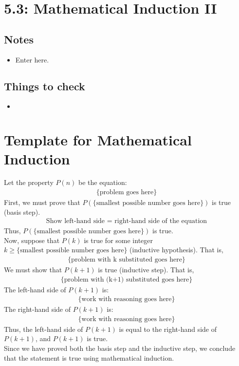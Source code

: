 \documentclass{article}
\begin{document}
\newpage \section{5.3: Mathematical Induction II}
    \subsection{Notes}
        \begin{itemize}
            \item Enter here.
        \end{itemize}

    \subsection{Things to check}
        \begin{itemize}
            \item 
        \end{itemize}

\newpage \section{Template for Mathematical Induction}
    Let the property $P(n)$ be the equation:
    \begin{align*}
        \text{\{problem goes here\}}
    \end{align*}
    First, we must prove that $P(\text{\{smallest possible number goes here\}})$ is true (basis step).
    \begin{align*}
        \text{Show left-hand side = right-hand side of the equation}
    \end{align*}
    Thus, $P(\text{\{smallest possible number goes here\}})$ is true. \\
    Now, suppose that $P(k)$ is true for some integer $k \geq \text{\{smallest possible number goes here\}}$ (inductive hypothesis). That is, 
    \begin{align*}
        \text{\{problem with k substituted goes here\}}
    \end{align*}
    We must show that $P(k+1)$ is true (inductive step). That is, 
    \begin{align*}
        \text{\{problem with (k+1) substituted goes here\}}
    \end{align*}
    The left-hand side of $P(k+1)$ is:
    \begin{align*}
        \text{\{work with reasoning goes here\}}
    \end{align*}
    The right-hand side of $P(k+1)$ is:
    \begin{align*}
        \text{\{work with reasoning goes here\}}
    \end{align*}
    Thus, the left-hand side of $P(k+1)$ is equal to the right-hand side of $P(k+1)$, and $P(k+1)$ is true. \\
    Since we have proved both the basis step and the inductive step, we conclude that the statement is true using mathematical induction.
\end{document}
